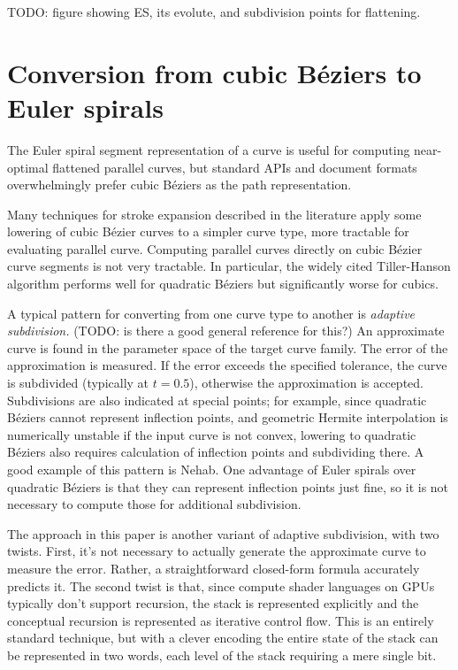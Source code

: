 \documentclass[sigconf, authordraft]{acmart}
\begin{document}
TODO: figure showing ES, its evolute, and subdivision points for flattening.

\section{Conversion from cubic Béziers to Euler spirals}

The Euler spiral segment representation of a curve is useful for computing near-optimal flattened parallel curves, but standard APIs and document formats overwhelmingly prefer cubic Béziers as the path representation.

Many techniques for stroke expansion described in the literature apply some lowering of cubic Bézier curves to a simpler curve type, more tractable for evaluating parallel curve. Computing parallel curves directly on cubic Bézier curve segments is not very tractable. In particular, the widely cited Tiller-Hanson algorithm\cite{Tiller1984} performs well for quadratic Béziers but significantly worse for cubics.


A typical pattern for converting from one curve type to another is \emph{adaptive subdivision.} (TODO: is there a good general reference for this?) An approximate curve is found in the parameter space of the target curve family. The error of the approximation is measured. If the error exceeds the specified tolerance, the curve is subdivided (typically at $t = 0.5$), otherwise the approximation is accepted. Subdivisions are also indicated at special points; for example, since quadratic Béziers cannot represent inflection points, and geometric Hermite interpolation is numerically unstable if the input curve is not convex, lowering to quadratic Béziers also requires calculation of inflection points and subdividing there. A good example of this pattern is Nehab\cite{Nehab2020}. One advantage of Euler spirals over quadratic Béziers is that they can represent inflection points just fine, so it is not necessary to compute those for additional subdivision.

The approach in this paper is another variant of adaptive subdivision, with two twists. First, it's not necessary to actually generate the approximate curve to measure the error. Rather, a straightforward closed-form formula accurately predicts it. The second twist is that, since compute shader languages on GPUs typically don't support recursion, the stack is represented explicitly and the conceptual recursion is represented as iterative control flow. This is an entirely standard technique, but with a clever encoding the entire state of the stack can be represented in two words, each level of the stack requiring a mere single bit.
\end{document}
